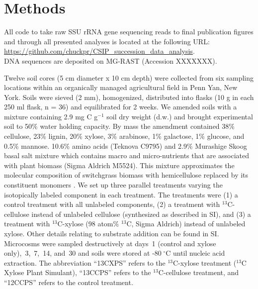 \section{Methods}
%
All code to take raw SSU rRNA gene sequencing reads to final publication
figures and through all presented analyses is located at the following URL:\\
\url{https://github.com/chuckpr/CSIP_succession_data_analysis}.\\ DNA sequences
are deposited on MG-RAST (Accession XXXXXXX).

Twelve soil cores (5 cm diameter x 10 cm depth) were collected from six 
sampling locations within an organically managed agricultural field in Penn
Yan, New York. Soils were sieved (2 mm), homogenized, distributed into flasks
(10 g in each 250 ml flask, n = 36) and equilibrated for 2 weeks. We amended
soils with a mixture containing 2.9 mg C g$^{-1}$ soil dry weight (d.w.) and
brought experimental soil to 50\% water holding capacity. By mass the amendment
contained 38\% cellulose, 23\% lignin, 20\% xylose, 3\% arabinose, 1\%
galactose, 1\% glucose, and 0.5\% mannose. 10.6\% amino acids (Teknova C9795)
and 2.9\% Murashige Skoog basal salt mixture which contains macro and
micro-nutrients that are associated with plant biomass (Sigma Aldrich M5524).
This mixture approximates the molecular composition of switchgrass biomass with
hemicellulose replaced by its constituent monomers
\citep{Schneckenberger_2008}. We set up three parallel treatments varying the
isotopically labeled component in each treatment. The treatments were (1)
a control treatment with all unlabeled components, (2) a treatment with
$^{13}$C-cellulose instead of unlabeled cellulose (synthesized as described in
SI), and (3) a treatment with $^{13}$C-xylose (98 atom\% $^{13}$C, Sigma
Aldrich) instead of unlabeled xylose. Other details relating to substrate
addition can be found in SI. Microcosms were sampled destructively at days~1
(control and xylose only),~3,~7,~14, and~30 and soils were stored at
-80 $^{\circ}$C until nucleic acid extraction. The abbreviation “13CXPS” refers
to the $^{13}$C-xylose treatment ($^{13}$C Xylose Plant Simulant), “13CCPS”
refers to the $^{13}$C-cellulose treatment, and “12CCPS” refers to the control
treatment.

